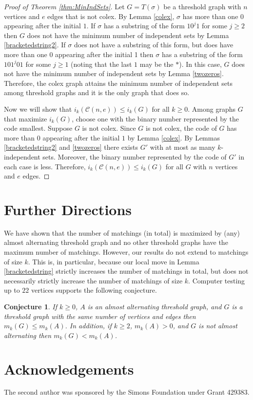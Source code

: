 \documentclass[12pt]{amsart}
\theoremstyle{plain}
\newtheorem{conj}[thm]{Conjecture}
\theoremstyle{definition}
\newcommand{\cC}{\mathcal{C}}
\begin{document}
\begin{proof}[Proof of Theorem \ref{thm:MinIndSets}]
Let $G = T(\sigma)$ be a threshold graph with $n$ vertices and $e$ edges  that is not colex.  By Lemma \ref{colex}, $\sigma$ has more than one $0$ appearing after the initial $1$.  If $\sigma$ has a substring of the form $10^j1$ for some $j\geq 2$ then $G$ does not have the minimum number of independent sets by Lemma \ref{bracketedstring2}.  If $\sigma$ does not have a substring of this form, but does have more than one $0$ appearing after the initial 1 then $\sigma$ has a substring of the form $101^j01$ for some $j\geq 1$ (noting that the last $1$ may be the $*$).  In this case, $G$ does not have the minimum number of independent sets by Lemma \ref{twozeros}.  Therefore, the colex graph attains the minimum number of independent sets among threshold graphs and it is the only graph that does so.

Now we will show that $i_k(\cC(n,e)) \leq i_k(G)$ for all $k\geq 0$.  Among graphs $G$ that maximize $i_k(G)$, choose one with the binary number represented by the code smallest.  Suppose $G$ is not colex.  Since $G$ is not colex, the code of $G$ has more than $0$ appearing after the initial $1$ by Lemma \ref{colex}.  By Lemmas \ref{bracketedstring2} and \ref{twozeros} there exists $G'$ with at most as many $k$-independent sets.  Moreover, the binary number represented by the code of $G'$ in each case is less.  Therefore, $i_k(\cC(n,e))\leq i_k(G)$ for all $G$ with $n$ vertices and $e$ edges.
\end{proof}

\section*{Further Directions}

We have shown that the number of matchings (in total) is maximized by (any) almost alternating threshold graph and no other threshold graphs have the maximum number of matchings.  However, our results do not extend to matchings of size $k$.  This is, in particular, because our local move in Lemma \ref{bracketedstring} strictly increases the number of matchings in total, but does not necessarily strictly increase the number of matchings of size $k$.  Computer testing up to $22$ vertices supports the following conjecture.

\begin{conj}
If $k\geq 0$, $A$ is an almost alternating threshold graph, and $G$ is a threshold graph with the same number of vertices and edges then $m_k(G)\leq m_k(A)$. In addition, if $k\geq 2$, $m_k(A)>0$, and $G$ is not almost alternating then $m_k(G) < m_k(A)$.
\end{conj}


\section*{Acknowledgements}

The second author was sponsored by the Simons Foundation under Grant 429383.



\end{document}
